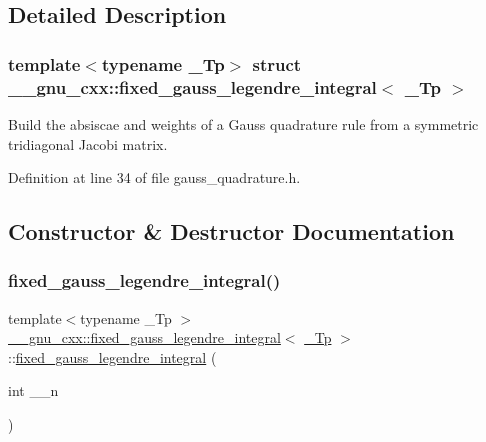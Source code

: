 \subsection{Detailed Description}
\subsubsection*{template$<$typename \+\_\+\+Tp$>$\newline
struct \+\_\+\+\_\+gnu\+\_\+cxx\+::fixed\+\_\+gauss\+\_\+legendre\+\_\+integral$<$ \+\_\+\+Tp $>$}

Build the absiscae and weights of a Gauss quadrature rule from a symmetric tridiagonal Jacobi matrix. 

Definition at line 34 of file gauss\+\_\+quadrature.\+h.



\subsection{Constructor \& Destructor Documentation}
\mbox{\label{struct____gnu__cxx_1_1fixed__gauss__legendre__integral_ad5210c037dcd806afb26e1888ce9676f}} 
\subsubsection{\texorpdfstring{fixed\+\_\+gauss\+\_\+legendre\+\_\+integral()}{fixed\_gauss\_legendre\_integral()}}
{\footnotesize\ttfamily template$<$typename \+\_\+\+Tp $>$ \\
\hyperlink{struct____gnu__cxx_1_1fixed__gauss__legendre__integral}{\+\_\+\+\_\+gnu\+\_\+cxx\+::fixed\+\_\+gauss\+\_\+legendre\+\_\+integral}$<$ \hyperlink{namespace____gnu__cxx_a3b19a9c800ca194374ef9172290f7d79}{\+\_\+\+Tp} $>$\+::\hyperlink{struct____gnu__cxx_1_1fixed__gauss__legendre__integral}{fixed\+\_\+gauss\+\_\+legendre\+\_\+integral} (\begin{DoxyParamCaption}\item[{int}]{\+\_\+\+\_\+n }\end{DoxyParamCaption})\hspace{0.3cm}{\ttfamily [explicit]}}

